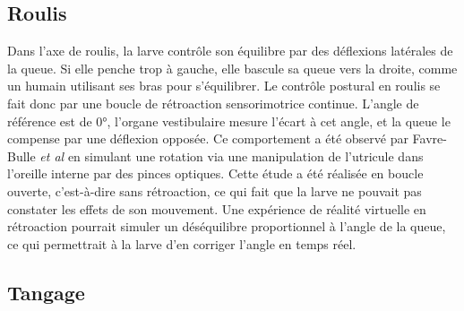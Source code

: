 \subsection{Roulis}
Dans l'axe de roulis, la larve contrôle son équilibre par des déflexions latérales de la queue. Si elle penche trop à gauche, elle bascule sa queue vers la droite, comme un humain utilisant ses bras pour s'équilibrer. Le contrôle postural en roulis se fait donc par une boucle de rétroaction sensorimotrice continue. L'angle de référence est de 0°, l'organe vestibulaire mesure l'écart à cet angle, et la queue le compense par une déflexion opposée. Ce comportement a été observé par Favre-Bulle \emph{et al} \cite{favre-bulle_optical_2017} en simulant une rotation via une manipulation de l'utricule dans l'oreille interne par des pinces optiques. Cette étude a été réalisée en boucle ouverte, c'est-à-dire sans rétroaction, ce qui fait que la larve ne pouvait pas constater les effets de son mouvement. Une expérience de réalité virtuelle en rétroaction pourrait simuler un déséquilibre proportionnel à l'angle de la queue, ce qui permettrait à la larve d'en corriger l'angle en temps réel.

\subsection{Tangage}

